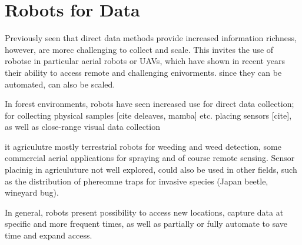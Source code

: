 \section{Robots for Data}


Previously seen that direct data methods provide increased information richness, however, are morec challenging to collect and scale. This invites the use of robotse in particular aerial robots or UAVs, which have shown in recent years their ability to access remote and challenging enivorments. since they can be automated, can also be scaled.

In forest environments, robots have seen increased use for direct data collection; for collecting physical samples [cite deleaves, mamba] etc. placing sensors [cite], as well as close-range visual data collection

it agriculutre mostly terrestrial robots for weeding and weed detection, some commercial aerial applications for spraying and of course remote sensing. Sensor placinig in agriculuture not well explored, could also be used in other fields, such as the distribution of phereomne traps for invasive species (Japan beetle, wineyard bug). 

In general, robots present possibility to access new locations, capture data at specific and more frequent times, as well as partially or fully automate to save time and expand access.


